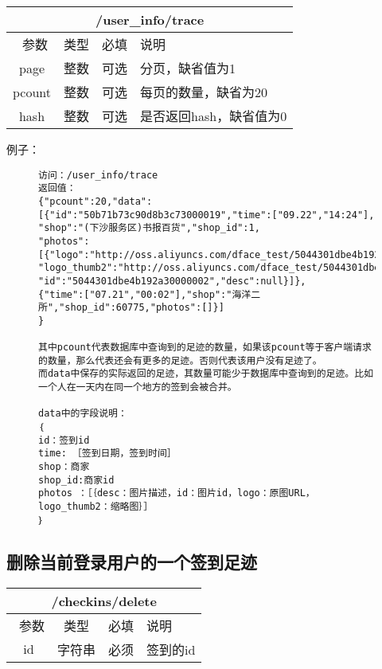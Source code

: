 \documentclass[cs4size]{ctexartutf8}
\begin{document}
\begin{table}[H]
   \begin{center}
\begin{tabular}{|c|c|c|p{12cm}|}
\hline
\multicolumn{4}{|c|}{/user\_info/trace} \\
\hline\hline
 \  参数  & 类型 & 必填 &  说明  \\
   \hline
 page  & 整数 & 可选 & 分页，缺省值为1\\ 
 \hline
 pcount  & 整数 & 可选 & 每页的数量，缺省为20\\ 
  \hline
 hash  & 整数 & 可选 & 是否返回hash，缺省值为0\\
 \hline
\end{tabular}
   \end{center}
\end{table}

例子：

\begin{figure}[H]
\begin{verbatim}
访问：/user_info/trace
返回值：
{"pcount":20,"data":
[{"id":"50b71b73c90d8b3c73000019","time":["09.22","14:24"],
"shop":"(下沙服务区)书报百货","shop_id":1,
"photos":[{"logo":"http://oss.aliyuncs.com/dface_test/5044301dbe4b192a30000002/0.jpg",
"logo_thumb2":"http://oss.aliyuncs.com/dface_test/5044301dbe4b192a30000002/t2_0.jpg",
"id":"5044301dbe4b192a30000002","desc":null}]},
{"time":["07.21","00:02"],"shop":"海洋二所","shop_id":60775,"photos":[]}]
}

其中pcount代表数据库中查询到的足迹的数量，如果该pcount等于客户端请求的数量，那么代表还会有更多的足迹。否则代表该用户没有足迹了。
而data中保存的实际返回的足迹，其数量可能少于数据库中查询到的足迹。比如一个人在一天内在同一个地方的签到会被合并。

data中的字段说明：
｛
id：签到id
time: ［签到日期，签到时间］
shop：商家
shop_id:商家id
photos ：［｛desc：图片描述，id：图片id，logo：原图URL，logo_thumb2：缩略图｝］
｝

\end{verbatim}
\end{figure}



\subsection{删除当前登录用户的一个签到足迹}

\begin{table}[H]
   \begin{center}
\begin{tabular}{|c|c|c|p{12cm}|}
\hline
\multicolumn{4}{|c|}{/checkins/delete} \\
\hline\hline
 \  参数  & 类型 & 必填 &  说明  \\
   \hline
 id  & 字符串 & 必须 & 签到的id\\ 
 \hline
\end{tabular}
   \end{center}
\end{table}
\end{document}
